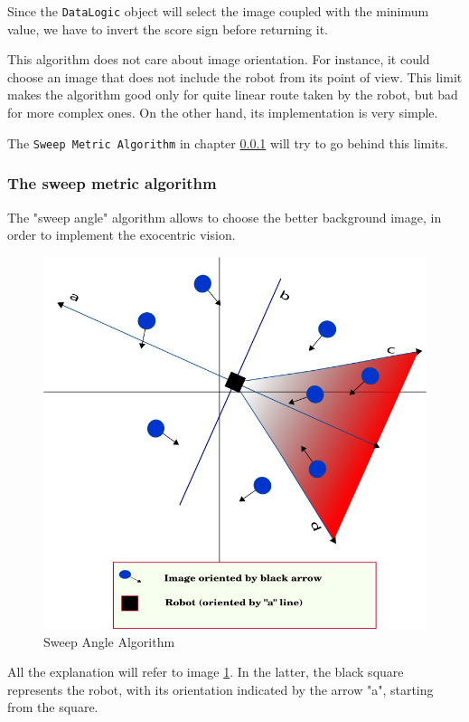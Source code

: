 %
Since the \texttt{DataLogic} object will select the image coupled with the minimum value, we have
to invert the score sign before returning it.
%

%
This algorithm does not care about image orientation. For instance, it could choose an image that
does not include the robot from its point of view. This limit makes the algorithm good only for
quite linear route taken by the robot, but bad for more complex ones. On the other hand, its
implementation is very simple.
%

%
The \texttt{Sweep Metric Algorithm} in chapter \ref{subsec:sweep_metric_algorithm} will try to
go behind this limits.


\subsubsection{The sweep metric algorithm}
\label{subsec:sweep_metric_algorithm}
The "sweep angle" algorithm allows to choose the better background image, in order to implement
the exocentric vision.
%
\begin{figure}[!h]
  \begin{center}
    \includegraphics[width=400pt]{img/half_plan_finding.png} 
    \caption{Sweep Angle Algorithm}
    \label{fig:half_plan_finding}
  \end{center}
\end{figure}
%
All the explanation will refer to image \ref{fig:half_plan_finding}. In the latter, the black
square represents the robot, with its orientation indicated by the arrow "a", starting from the
square.
%

